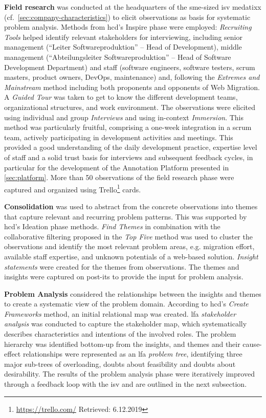 \textbf{Field research} was conducted at the headquarters of the \gls{sme}-sized \gls{isv} medatixx (cf.~\cref{sec:company-characteristics}) to elicit observations as basis for systematic problem analysis.
Methods from \gls{hcd}'s Inspire phase were employed: \emph{Recruiting Tools} helped identify relevant stakeholders for interviewing, including senior management (``Leiter Softwareproduktion'' -- Head of Development), middle management (``Abteilungsleiter Softwareproduktion'' -- Head of Software Development Department) and staff (software engineers, software testers, scrum masters, product owners, DevOps, maintenance) and, following the \emph{Extremes and Mainstream} method including both proponents and opponents of \gls{Web Migration}.
A \emph{Guided Tour} was taken to get to know the different development teams, organizational structures, and work environment.
The observations were elicited using individual and group \emph{Interviews} and using in-context \emph{Immersion}.
This method was particularly fruitful, comprising a one-week integration in a scrum team, actively participating in development activities and meetings.
This provided a good understanding of the daily development practice, expertise level of staff and a solid trust basis for interviews and subsequent feedback cycles, in particular for the development of the Annotation Platform presented in \cref{sec:platform}.
More than 50 observations of the field research phase were captured and organized using Trello\footnote{\url{https://trello.com/} Retrieved: 6.12.2019} cards. %

\textbf{Consolidation} was used to abstract from the concrete observations into themes that capture relevant and recurring problem patterns.
This was supported by \gls{hcd}'s Ideation phase methods.
\emph{Find Themes} in combination with the collaborative filtering proposed in the \emph{Top Five} method was used to cluster the observations and identify the most relevant problem areas, e.g. migration effort, available staff expertise, and unknown potentials of a \gls{web}-based solution.
\emph{Insight statements} were created for the themes from observations.
The themes and insights were captured on post-its to provide the input for problem analysis.

\textbf{Problem Analysis} considered the relationships between the insights and themes to create a systematic view of the problem domain.
According to \gls{hcd}'s \emph{Create Frameworks} method, an initial relational map was created.
\gls{lfa} \emph{stakeholder analysis} was conducted to capture the stakeholder map, which systematically describes characteristics and intentions of the involved roles.
The problem hierarchy was identified bottom-up from the insights, and themes and their cause-effect relationships were represented as an \gls{lfa} \emph{problem tree}, identifying three major sub-trees of overloading, doubts about feasibility and doubts about desirability.
The results of the problem analysis phase were iteratively improved through a feedback loop with the \gls{isv} and are outlined in the next subsection.

